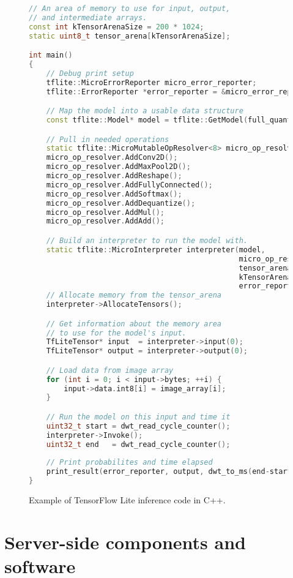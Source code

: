 \begin{figure}[ht] 
    \begin{lstlisting}[language=C++]
// An area of memory to use for input, output, 
// and intermediate arrays.
const int kTensorArenaSize = 200 * 1024;
static uint8_t tensor_arena[kTensorArenaSize];

int main() 
{
    // Debug print setup
    tflite::MicroErrorReporter micro_error_reporter;
    tflite::ErrorReporter *error_reporter = &micro_error_reporter;

    // Map the model into a usable data structure
    const tflite::Model* model = tflite::GetModel(full_quant_tflite);

    // Pull in needed operations
    static tflite::MicroMutableOpResolver<8> micro_op_resolver;
    micro_op_resolver.AddConv2D();
    micro_op_resolver.AddMaxPool2D();
    micro_op_resolver.AddReshape();
    micro_op_resolver.AddFullyConnected();
    micro_op_resolver.AddSoftmax();
    micro_op_resolver.AddDequantize();
    micro_op_resolver.AddMul();
    micro_op_resolver.AddAdd();

    // Build an interpreter to run the model with.
    static tflite::MicroInterpreter interpreter(model, 
                                                micro_op_resolver, 
                                                tensor_arena,
                                                kTensorArenaSize, 
                                                error_reporter);
    // Allocate memory from the tensor_arena
    interpreter->AllocateTensors();

    // Get information about the memory area 
    // to use for the model's input.
    TfLiteTensor* input  = interpreter->input(0);
    TfLiteTensor* output = interpreter->output(0);

    // Load data from image array
    for (int i = 0; i < input->bytes; ++i) {
        input->data.int8[i] = image_array[i];
    }

    // Run the model on this input and time it
    uint32_t start = dwt_read_cycle_counter();
    interpreter->Invoke();
    uint32_t end   = dwt_read_cycle_counter();
    
    // Print probabilites and time elapsed
    print_result(error_reporter, output, dwt_to_ms(end-start));
}
    \end{lstlisting}
    \caption{ Example of TensorFlow Lite inference code in C++.}
    \label{inference_code}
\end{figure}

\section{ Server-side components and software}

